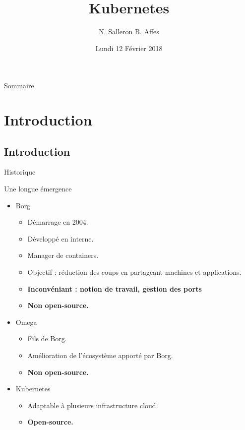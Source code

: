 \documentclass{bredelebeamer}
\title[Kubernetes]{Kubernetes}
\subtitle{ }
\author{N. Salleron B. Affes}
\date{Lundi 12 Février 2018}
\begin{document}
\begin{frame}
  \titlepage
\end{frame}

\begin{frame}{Sommaire}
  \tableofcontents
\end{frame}

\section{Introduction}
\subsection{Introduction}

\begin{frame}{Historique}
\begin{block}{Une longue émergence}
\begin{itemize}
\item Borg
	\begin{itemize}
	\item Démarrage en 2004.
	\item Développé en interne.
	\item Manager de containers.
	\item Objectif : réduction des coups en partageant machines et applications.
	\item \textbf{Inconvéniant : notion de travail, gestion des ports}
	\item \textbf{Non open-source.}
	\end{itemize}	\pause
\item Omega	
	\begin{itemize}
	\item Fils de Borg.
	\item Amélioration de l'écosystème apporté par Borg.
	\item  \textbf{Non open-source.}
	\end{itemize}   \pause
\item Kubernetes
	\begin{itemize}
	\item Adaptable à plusieurs infrastructure cloud.
	\item  \textbf{Open-source.}
	\end{itemize}
\end{itemize}
\end{block}
\end{frame}
\end{document}
